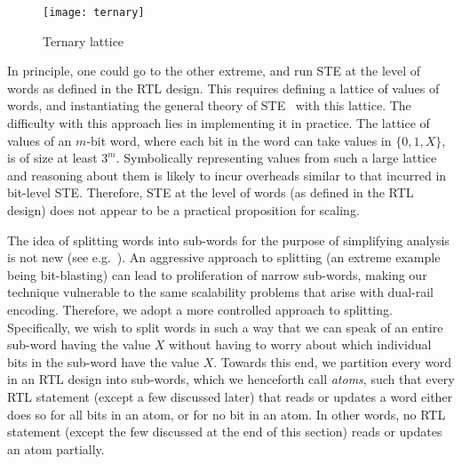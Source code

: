 \documentclass{llncs}
\begin{document}
\begin{wrapfigure}[8]{R}{0.2\textwidth}
\begin{center}
\vspace*{-0.4in}
\texttt{[image: ternary]}
\caption{\label{ternary-lattice}Ternary lattice}
\end{center}
\end{wrapfigure}
In principle, one could go to the other extreme, and run STE at the level
of words as defined in the RTL design.  This requires defining a
lattice of values of words, and instantiating the general theory of
STE~\cite{SegerBryant95} with this lattice.  The difficulty with this
approach lies in implementing it in practice.  The lattice of values
of an $m$-bit word, where each bit in the word can take values in
$\{0, 1, X\}$, is of size at least $3^m$.  Symbolically representing
values from such a large lattice and reasoning about them is
likely to incur overheads similar to that incurred in bit-level STE.
Therefore, STE at the level of words (as defined in the RTL design)
does not appear to be a practical proposition for scaling.

The idea of splitting words into sub-words for the purpose of
simplifying analysis is not new (see e.g.~\cite{Joh01}).  An
aggressive approach to splitting (an extreme example being
bit-blasting) can lead to proliferation of narrow sub-words, making
our technique vulnerable to the same scalability problems that arise
with dual-rail encoding.  Therefore, we adopt a more controlled
approach to splitting.  Specifically, we wish to split words in such a
way that we can speak of an entire sub-word having the value $X$
without having to worry about which individual bits in the sub-word
have the value $X$.  Towards this end, we partition every word in an
RTL design into sub-words, which we henceforth call \emph{atoms}, such
that every RTL statement (except a few discussed later) that reads or
updates a word either does so for all bits in an atom, or for no bit
in an atom.  In other words, no RTL statement (except the few
discussed at the end of this section) reads or updates an atom partially.  
\end{document}
